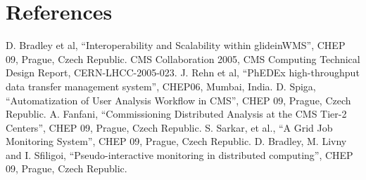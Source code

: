 \documentclass[a4paper]{jpconf}
\begin{document}
\section*{References}
\begin{thebibliography}{15}

D. Bradley et al, ``Interoperability and Scalability within glideinWMS'', CHEP 09, Prague, Czech Republic.
CMS Collaboration 2005, CMS Computing Technical Design Report, CERN-LHCC-2005-023.
J. Rehn et al, ``PhEDEx high-throughput data transfer management system'', CHEP06, Mumbai, India.
D. Spiga, ``Automatization of User Analysis Workflow in CMS'', CHEP 09, Prague, Czech Republic.
A. Fanfani, ``Commissioning Distributed Analysis at the CMS Tier-2 Centers'', CHEP 09, Prague, Czech Republic.
S. Sarkar, et al., ``A Grid Job Monitoring System'', CHEP 09, Prague, Czech Republic.
D. Bradley, M. Livny and I. Sfiligoi, ``Pseudo-interactive monitoring in distributed computing'', CHEP 09, Prague, Czech Republic.
\end{thebibliography}
\end{document}

